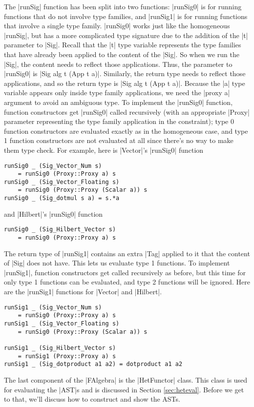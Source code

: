 \documentclass[preprint]{sigplanconf}
\theoremstyle{definition}
\begin{document}
The |runSig| function has been split into two functions:
|runSig0| is for running functions that do not involve type families,
and |runSig1| is for running functions that involve a single type family.
|runSig0| works just like the homogeneous |runSig|,
but has a more complicated type signature due to the addition of the |t| parameter to |Sig|.
Recall that the |t| type variable represents the type families that have already been applied to the content of the |Sig|.
So when we run the |Sig|, the content needs to reflect those applications.
Thus, the parameter to |runSig0| is |Sig alg t (App t a)|.
Similarly, the return type needs to reflect those applications,
and so the return type is |Sig alg t (App t a)|.
Because the |a| type variable appears only inside type family applications,
we need the |proxy a| argument to avoid an ambiguous type.
To implement the |runSig0| function, function constructors get |runSig0| called recursively (with an appropriate |Proxy| parameter representing the type family application in the constraint);
type 0 function constructors are evaluated exactly as in the homogeneous case,
and type 1 function constructors are not evaluated at all since there's no way to make them type check.
For example, here is |Vector|'s |runSig0| function
\begin{lstlisting}
runSig0 _ (Sig_Vector_Num s)
    = runSig0 (Proxy::Proxy a) s
runSig0 _ (Sig_Vector_Floating s)
    = runSig0 (Proxy::Proxy (Scalar a)) s
runSig0 _ (Sig_dotmul s a) = s.*a
\end{lstlisting}
and |Hilbert|'s |runSig0| function
\begin{lstlisting}
runSig0 _ (Sig_Hilbert_Vector s)
    = runSig0 (Proxy::Proxy a) s
\end{lstlisting}
The return type of |runSig1| contains an extra |Tag| applied to it that the content of |Sig| does not have.
This lets us evaluate type 1 functions.
To implement |runSig1|, function constructors get called recursively as before,
but this time for only type 1 functions can be evaluated,
and type 2 functions will be ignored.
Here are the |runSig1| functions for |Vector| and |Hilbert|.
\begin{lstlisting}
runSig1 _ (Sig_Vector_Num s)
    = runSig0 (Proxy::Proxy a) s
runSig1 _ (Sig_Vector_Floating s)
    = runSig0 (Proxy::Proxy (Scalar a)) s

runSig1 _ (Sig_Hilbert_Vector s)
    = runSig1 (Proxy::Proxy a) s
runSig1 _ (Sig_dotproduct a1 a2) = dotproduct a1 a2
\end{lstlisting}
The last component of the |FAlgebra| is the |HetFunctor| class.
This class is used for evaluating the |AST|s and is discussed in Section \ref{sec:heteval}.
Before we get to that,
we'll discuss how to construct and show the ASTs.
\end{document}
